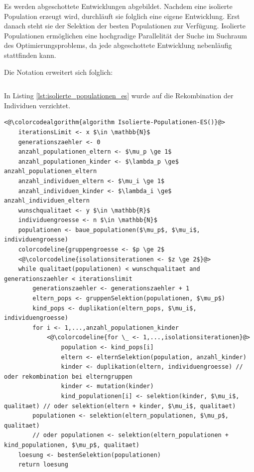 Es werden abgeschottete Entwicklungen abgebildet.
Nachdem eine isolierte Population erzeugt wird, durchläuft sie folglich eine eigene Entwicklung.
Erst danach steht sie der Selektion der besten Populationen zur Verfügung.
Isolierte Populationen ermöglichen eine hochgradige Parallelität der Suche im Suchraum des Optimierungsproblems, da jede abgeschottete Entwicklung nebenläufig stattfinden kann.

Die Notation erweitert sich folglich:

\begin{equation}
[\mu_p / p_p \# \lambda_p (\mu_i / p_i \# \lambda_i)^{\textbackslash n}]
\end{equation}

In Listing \ref{lst:isolierte_populationen_es} wurde auf die Rekombination der Individuen verzichtet.

\begin{lstlisting}[caption={Evolutionsstrategien mit isolierten Populationen}, firstnumber=1, captionpos=b, label=lst:isolierte_populationen_es]
<@\colorcodealgorithm{algorithm Isolierte-Populationen-ES()}@>
	iterationsLimit <- x $\in \mathbb{N}$
	generationszaehler <- 0
	anzahl_populationen_eltern <- $\mu_p \ge 1$
	anzahl_populationen_kinder <- $\lambda_p \ge$ anzahl_populationen_eltern
	anzahl_individuen_eltern <- $\mu_i \ge 1$
	anzahl_individuen_kinder <- $\lambda_i \ge$ anzahl_individuen_eltern
	wunschqualitaet <- y $\in \mathbb{R}$
	individuengroesse <- n $\in \mathbb{N}$
	populationen <- baue_populationen($\mu_p$, $\mu_i$, individuengroesse)
	colorcodeline{gruppengroesse <- $p \ge 2$
	<@\colorcodeline{isolationsiterationen <- $z \ge 2$}@>
	while qualitaet(populationen) < wunschqualitaet and generationszaehler < iterationslimit
		generationszaehler <- generationszaehler + 1
		eltern_pops <- gruppenSelektion(populationen, $\mu_p$)
		kind_pops <- duplikation(eltern_pops, $\mu_i$, individuengroesse)
		for i <- 1,...,anzahl_populationen_kinder
			<@\colorcodeline{for \_ <- 1,...,isolationsiterationen}@>
				population <- kind_pops[i]
				eltern <- elternSelektion(population, anzahl_kinder)
				kinder <- duplikation(eltern, individuengroesse) // oder rekombination bei elterngruppen
				kinder <- mutation(kinder)
				kind_populationen[i] <- selektion(kinder, $\mu_i$, qualitaet) // oder selektion(eltern + kinder, $\mu_i$, qualitaet)
		populationen <- selektion(eltern_populationen, $\mu_p$, qualitaet)
		// oder populationen <- selektion(eltern_populationen + kind_populationen, $\mu_p$, qualitaet)
	loesung <- bestenSelektion(populationen)
	return loesung
\end{lstlisting}

